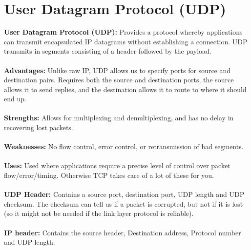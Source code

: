 \documentclass[a4paper,10pt]{article}
\begin{document}
\section{User Datagram Protocol (UDP)}
\textcolor{PineGreen}{\textbf{User Datagram Protocol (UDP):}} Provides a protocol whereby applications can transmit encapsulated IP datagrams without establishing a connection. UDP transmits in segments consisting of a header followed by the payload. \\\\
\textcolor{PineGreen}{\textbf{Advantages:}} Unlike raw IP, UDP allows us to specify ports for source and destination pairs. Requires both the source and destination ports, the source allows it to send replies, and the destination allows it to route to where it should end up. \\\\
\textcolor{PineGreen}{\textbf{Strengths:}} Allows for multiplexing and demultiplexing, and has no delay in recovering lost packets. \\\\
\textcolor{PineGreen}{\textbf{Weaknesses:}} No flow control, error control, or retransmission of bad segments. \\\\
\textcolor{PineGreen}{\textbf{Uses:}} Used where applications require a precise level of control over packet flow/error/timing. Otherwise TCP takes care of a lot of these for you. \\\\
\textcolor{PineGreen}{\textbf{UDP Header:}} Contains a source port, destination port, UDP length and UDP checksum. The checksum can tell us if a packet is corrupted, but not if it is lost (so it might not be needed if the link layer protocol is reliable). \\\\ 
\textcolor{PineGreen}{\textbf{IP header:}} Contains the source header, Destination address, Protocol number and UDP length.
\end{document}

